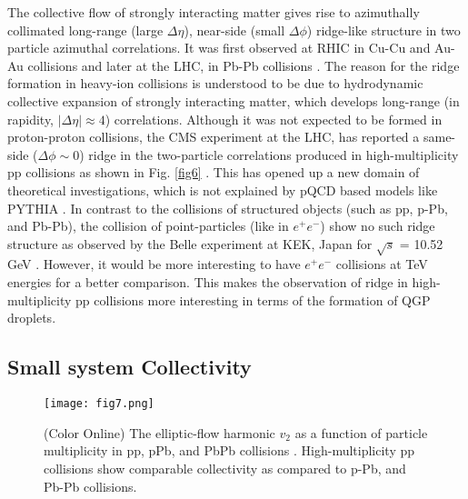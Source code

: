 \documentclass[showpacs,showkeys,aps,twocolumn]{revtex4}
\newcommand\+{\dagger}
\begin{document}
The collective flow of strongly interacting matter gives rise to azimuthally collimated  long-range (large $\Delta \eta$), near-side (small $\Delta \phi$) ridge-like structure in two particle azimuthal correlations. It was first observed at RHIC in Cu-Cu \cite{Ref21} and Au-Au \cite{Ref22} collisions and later at the LHC, in Pb-Pb collisions \cite{Ref23}. The reason for the ridge formation in heavy-ion collisions is understood to be due to hydrodynamic collective expansion of strongly interacting matter, which  develops long-range (in rapidity, $|\Delta \eta| \approx 4$) correlations. Although it was not expected to be formed in proton-proton collisions, the CMS experiment at the LHC, has reported a same-side ($\Delta \phi \sim 0$) ridge in the two-particle correlations produced in high-multiplicity pp collisions as shown in Fig. \ref{fig6} \cite{Ref24}. This has opened up a new domain of theoretical investigations, which is not explained by pQCD based models like PYTHIA \cite{Ref25}. In contrast to the collisions of structured objects (such as pp, p-Pb, and Pb-Pb), the collision of point-particles (like in $e^+e^-$) show no such ridge structure as observed by the Belle experiment at KEK, Japan for $\sqrt{s}$ = 10.52 GeV \cite{Ref26}. However, it would be more interesting to have $e^+e^-$ collisions at TeV energies for a better comparison. This makes the observation of ridge in high-multiplicity pp collisions more interesting in terms of the formation of QGP droplets.

\subsection{Small system Collectivity}
\begin{figure}[ht]
\texttt{[image: fig7.png]}
\caption[]{(Color Online) The elliptic-flow harmonic $v_2$ as a function of particle multiplicity in pp, pPb, and PbPb collisions \cite{Ref25}. High-multiplicity pp collisions show comparable collectivity as compared to p-Pb, and Pb-Pb collisions.}
\label{fig7}
\end{figure}
\end{document}
